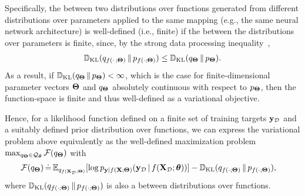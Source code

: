 Specifically, the \kld between two distributions over functions generated from different distributions over parameters applied to the same mapping (e.g., the same neural network architecture) is well-defined (i.e., finite) if the \kld between the distributions over parameters is finite, since, by the strong data processing inequality~\citep{Polyanskiy2017data},
\begin{align}
    \mathbb{D}_\textrm{KL}(q_{f( \cdot \,; \boldsymbol{\Theta})} \,\|\, p_{f(\cdot ; \boldsymbol{\Theta})}) \leq \mathbb{D}_\textrm{KL}(q_{\boldsymbol{\Theta}} \,\|\, p_{\boldsymbol{\Theta}}).
\end{align}
As a result, if $\mathbb{D}_\textrm{KL}(q_{\boldsymbol{\Theta}} \,\|\, p_{\boldsymbol{\Theta}}) < \infty$, which is the case for finite-dimensional parameter vectors $\boldsymbol{\Theta}$ and $q_{\boldsymbol{\Theta}}$ absolutely continuous with respect to $p_{\boldsymbol{\Theta}}$, then the function-space \kld is finite and thus well-defined as a variational objective.
%

Hence, for a likelihood function defined on a finite set of training targets $\mathbf y_{\mathcal{D}}$ and a suitably defined prior distribution over functions, we can express the variational problem above equivalently as the well-defined maximization problem \mbox{$\max_{q_{\boldsymbol{\Theta}} \in \mathcal{Q}_{{\boldsymbol{\theta}}}} \mathcal{F}(q_{\boldsymbol{\Theta}})$} with
\begin{align}
\begin{split}
\label{eq:kld_function_space}
    \mathcal{F}(q_{\boldsymbol{\Theta}})
    &
    \,\dot{=}\,
    \mathbb{E}_{q_{f(\mathbf X_{\mathcal{D}} ; \boldsymbol{\Theta})}}[\log p_{\mathbf y | f(\mathbf X ; \boldsymbol{\Theta})}(\mathbf y_{\mathcal{D}} \,|\, f(\mathbf X_{\mathcal{D}} ; {\boldsymbol{\theta}}) )]
    - \mathbb{D}_\textrm{KL}(q_{f(\cdot ; \boldsymbol{\Theta})} \,\|\, p_{f(\cdot ; \boldsymbol{\Theta})})
    ,
\end{split}
\end{align}%
where $\mathbb{D}_\textrm{KL}(q_{f(\cdot ; \boldsymbol{\Theta})} \,\|\, p_{f(\cdot ; \boldsymbol{\Theta})})$ is also a \kld between distributions over functions.

